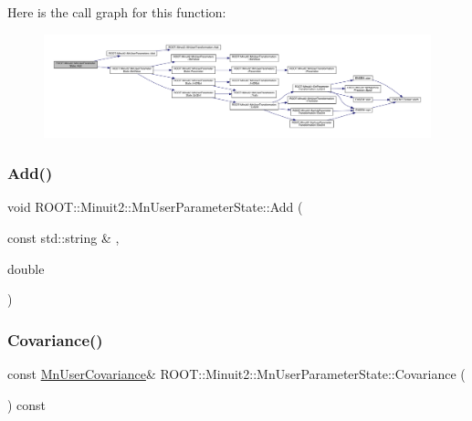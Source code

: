 Here is the call graph for this function\+:
\nopagebreak
\begin{figure}[H]
\begin{center}
\leavevmode
\includegraphics[width=350pt]{d3/de0/classROOT_1_1Minuit2_1_1MnUserParameterState_a553bf18d39208bf83a8d7898176b20e6_cgraph}
\end{center}
\end{figure}
\mbox{\label{classROOT_1_1Minuit2_1_1MnUserParameterState_a553bf18d39208bf83a8d7898176b20e6}} 
\subsubsection{\texorpdfstring{Add()}{Add()}\hspace{0.1cm}{\footnotesize\ttfamily [9/9]}}
{\footnotesize\ttfamily void R\+O\+O\+T\+::\+Minuit2\+::\+Mn\+User\+Parameter\+State\+::\+Add (\begin{DoxyParamCaption}\item[{const std\+::string \&}]{,  }\item[{double}]{ }\end{DoxyParamCaption})}

\mbox{\label{classROOT_1_1Minuit2_1_1MnUserParameterState_a0e8ae6fe41fbc8eb1c218742ed080e0e}} 
\subsubsection{\texorpdfstring{Covariance()}{Covariance()}\hspace{0.1cm}{\footnotesize\ttfamily [1/3]}}
{\footnotesize\ttfamily const \mbox{\hyperlink{classROOT_1_1Minuit2_1_1MnUserCovariance}{Mn\+User\+Covariance}}\& R\+O\+O\+T\+::\+Minuit2\+::\+Mn\+User\+Parameter\+State\+::\+Covariance (\begin{DoxyParamCaption}{ }\end{DoxyParamCaption}) const\hspace{0.3cm}{\ttfamily [inline]}}

